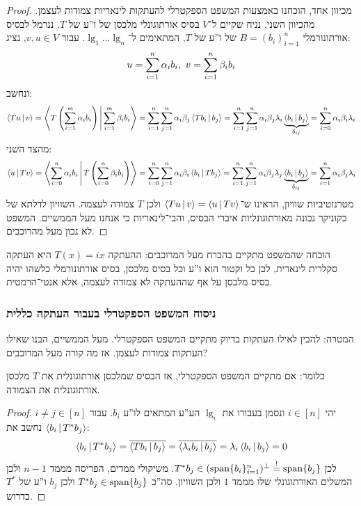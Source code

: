 \documentclass[name=רשימות אלגברה לינארית 2א]{../../../tex/classes/megasumPreamble}
\begin{document}
	\begin{proof}
		מכיוון אחד, הוכחנו באמצעות המשפט הספקטרלי להעתקות לינאריות צמודות לעצמן. 
		מהכיוון השני, נניח שקיים ל־$V$ בסיס אורתוגונלי מלכסן של ו''ע של $T$. ננרמל לבסיס אורתונורמלי $B = (b_i)_{i = 1}^{n}$ של ו''ע של $T$, המתאימים ל־$\lg_1 \dots \lg_n$. עבור $v, u \in V$, נציג: 
		\[ u = \sum_{i = 1}^{n}\alpha_i b_i, \ v = \sum_{i = 1}^{n}\beta_i b_i \]
		ונחשב: 
		\[ \left \langle Tu \,\middle|\, v \right \rangle = \left \langle T\left ( \sum_{i = 1}^{m}\alpha_i b_i \right ) \,\middle|\, \sum_{i = 1}^{m}\beta_i b_i \right \rangle = \sum_{i = 1}^{n}\sum_{j = 1}^{n}\alpha_i \beta_j \left \langle T b_i \,\middle|\, b_j \right \rangle = \sum_{i = 1}^{n}\sum_{j = 1}^{n}\alpha_i \beta_j \lambda_i \underbrace{\left \langle b_i \,\middle|\, b_j \right \rangle}_{\delta_{ij}} = \sum_{i = 0}^{n} \alpha_i \beta_i \lambda_i \]
		מהצד השני: 
		\[ \left \langle u \,\middle|\, Tv \right \rangle = \left \langle \sum_{i = 0}^{n} \alpha_i b_i \,\middle|\, T\left ( \sum_{i = 0}^{n} \beta_i b_i \right ) \right \rangle = \sum_{i = 0}^{n} \sum_{j = 1}^{n}\alpha_i \beta_i \left \langle b_i \,\middle|\, Tb_j \right \rangle = \sum_{i = 1}^{n}\sum_{j = 1}^{n}\alpha_i \beta_j \lambda_j \underbrace{\left \langle b_i \,\middle|\, b_j \right \rangle}_{\delta_{ij}} = \sum_{i = 1}^{n}\alpha_i \beta_j \lambda_i \]
		מטרנזטיביות שוויון, הראינו ש־$\left \langle Tu \,\middle|\, v \right \rangle = \left \langle u \,\middle|\, Tv \right \rangle$ ולכן $T$ צמודה לעצמה. השוויון לדלתא של כקוניקר נכונה מאורתוגונליות איברי הבסיס, והבי־לינאריות כי אנחנו מעל הממשיים. המשפט לא נכון מעל מהרוכבים. 
	\end{proof}
	הוכחה שהמשפט מתקיים בהכרח מעל המרוכבים: ההעתקה $T(x) = ix$ היא העתקה סקלרית לינארית, לכן כל וקטור הוא ו''ע וכל בסיס מלכסן, בסיס אורתונורמלי כלשהו יהיה בסיס מלכסן על אף שההעתקה לא צמודה לעצמה, אלא אנטי־הרמטית. 
	
	
	\subsubsection{ניסוח המשפט הספקטרלי בעבור העתקה כללית}
	
	המטרה: להבין לאילו העתקות בדיוק מתקיים המשפט הספקטרלי. מעל הממשיים, הבנו שאילו העתקות צמודות לעצמן. אז מה קורה מעל המרוכבים? 
	
	כלומר: אם מתקיים המשפט הספקטרלי, אז הבסיס שמלכסן אורתוגונלית את $T$ מלכסן אורתוגונלית את הצמודה. 
	\begin{proof}
		יהי $i \in [n]$ ונסמן בעבורו את $\lg_i$ הע''ע המתאים לו''ע $b_i$. עבור $i \neq j \in [n]$ נחשב את $\left \langle b_i \,\middle|\, T^*b_j \right \rangle$: 
		\[ \left \langle b_i \,\middle|\, T^*b_j \right \rangle = \overline{\left \langle Tb_i \,\middle|\, b_j \right \rangle} = \overline{\left \langle \lambda _i b_i \,\middle|\, b_j \right \rangle} = \lambda_i \left \langle b_i \,\middle|\, b_j \right \rangle = 0 \]
		לכן $T^*b_j \in (\operatorname{span}\{b_i\}_{i = 1}^{n})^{\perp} \overset{!}{=} \operatorname{span}\{b_j\}$. משיקולי ממדים, הפריסה מממד $n - 1$ ולכן המשלים האורתוגונלי שלו מממד $1$ ולכן השוויון. סה''כ $T^* b_j \in \operatorname{span}\{b_j\}$ ולכן $b_j$ ו''ע של $T^*$ כדרוש. 
	\end{proof}
	
\end{document}
